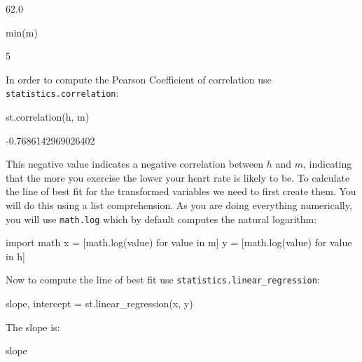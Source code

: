 \begin{raw}
62.0
\end{raw}







\begin{pyin}
min(m)
\end{pyin}





\begin{raw}
5
\end{raw}





In order to compute the Pearson Coefficient of correlation use
\texttt{statistics.correlation}:




\begin{pyin}
st.correlation(h, m)
\end{pyin}





\begin{raw}
-0.7686142969026402
\end{raw}





This negative value indicates a negative correlation between \(h\) and \(m\),
indicating that the more you exercise the lower your heart rate is likely to be.
To calculate the line of best fit for the transformed variables we need to first
create them. You will do this using a list comprehension. As you are doing
everything numerically, you will use \texttt{math.log} which by default computes the
natural logarithm:




\begin{pyin}
import math
x = [math.log(value) for value in m]
y = [math.log(value) for value in h]
\end{pyin}

Now to compute the line of best fit use \texttt{statistics.linear\_regression}:




\begin{pyin}
slope, intercept = st.linear_regression(x, y)
\end{pyin}

The slope is:

\begin{pyin}
slope
\end{pyin}





